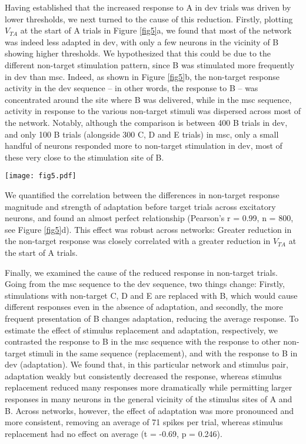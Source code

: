 \documentclass[pdflatex,referee,iicol,sn-basic]{sn-jnl}
\theoremstyle{thmstyleone}%
\theoremstyle{thmstyletwo}%
\theoremstyle{thmstylethree}%
\begin{document}
Having established that the increased response to A in dev trials was driven by lower thresholds, we next turned to the cause of this reduction. Firstly, plotting $V_{TA}$ at the start of A trials in Figure \ref{fig5}a, we found that most of the network was indeed less adapted in dev, with only a few neurons in the vicinity of B showing higher thresholds. We hypothesized that this could be due to the different non-target stimulation pattern, since B was stimulated more frequently in dev than msc. Indeed, as shown in Figure \ref{fig5}b, the non-target response activity in the dev sequence -- in other words, the response to B -- was concentrated around the site where B was delivered, while in the msc sequence, activity in response to the various non-target stimuli was dispersed across most of the network. Notably, although the comparison is between 400 B trials in dev, and only 100 B trials (alongside 300 C, D and E trials) in msc, only a small handful of neurons responded more to non-target stimulation in dev, most of these very close to the stimulation site of B.

\begin{figure*}%
    \centering
    \texttt{[image: fig5.pdf]}
    \caption{}
    \label{fig5}
\end{figure*}

We quantified the correlation between the differences in non-target response magnitude and strength of adaptation before target trials across excitatory neurons, and found an almost perfect relationship (Pearson's r = 0.99, n = 800, see Figure \ref{fig5}d). This effect was robust across networks: Greater reduction in the non-target response was closely correlated with a greater reduction in $V_{TA}$ at the start of A trials.

Finally, we examined the cause of the reduced response in non-target trials. Going from the msc sequence to the dev sequence, two things change: Firstly, stimulations with non-target C, D and E are replaced with B, which would cause different responses even in the absence of adaptation, and secondly, the more frequent presentation of B changes adaptation, reducing the average response. To estimate the effect of stimulus replacement and adaptation, respectively, we contrasted the response to B in the msc sequence with the response to other non-target stimuli in the same sequence (replacement), and with the response to B in dev (adaptation). We found that, in this particular network and stimulus pair, adaptation weakly but consistently decreased the response, whereas stimulus replacement reduced many responses more dramatically while permitting larger responses in many neurons in the general vicinity of the stimulus sites of A and B. Across networks, however, the effect of adaptation was more pronounced and more consistent, removing an average of 71 spikes per trial, whereas stimulus replacement had no effect on average (t = -0.69, p = 0.246).
\end{document}
